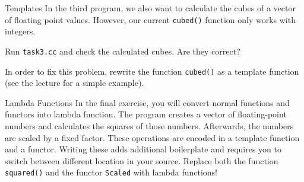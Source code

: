 \documentclass[12pt,a4paper]{article}
\begin{document}
\begin{Exercise}{Templates}
In the third program, we also want to calculate the cubes of a vector of floating point values. However,
our current \texttt{cubed()} function only works with integers.

Run \texttt{task3.cc} and check the calculated cubes. Are they correct?

In order to fix this problem, rewrite the function \texttt{cubed()} as a template function (see the lecture
for a simple example).

\end{Exercise}

\begin{Exercise}{Lambda Functions}
In the final exercise, you will convert normal functions and functors into lambda function. The program creates a vector of floating-point numbers and calculates the squares of those numbers. Afterwards, the numbers are scaled by a fixed factor. These operations are encoded in a template function and a functor. Writing these adds additional boilerplate and requires you to switch between different location in your source. Replace both the function \texttt{squared()} and the functor \texttt{Scaled} with lambda functions!
\end{Exercise}
\end{document}
